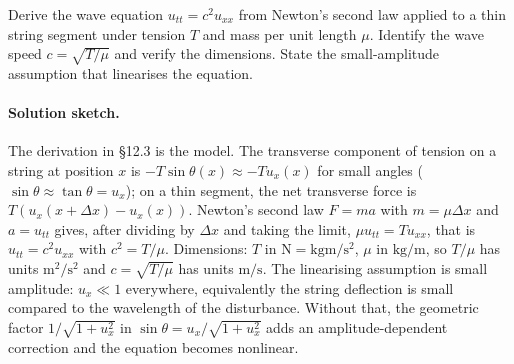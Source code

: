 \begin{exercise}
Derive the wave equation $u_{tt} = c^{2} u_{xx}$ from Newton's
second law applied to a thin string segment under tension $T$ and
mass per unit length $\mu$. Identify the wave speed $c =
\sqrt{T/\mu}$ and verify the dimensions. State the small-amplitude
assumption that linearises the equation.

\paragraph{Solution sketch.}
The derivation in §12.3 is the model. The transverse component of
tension on a string at position $x$ is $-T \sin\theta(x) \approx
-T u_{x}(x)$ for small angles ($\sin\theta \approx \tan\theta =
u_{x}$); on a thin segment, the net transverse force is $T(u_{x}(x
+ \Delta x) - u_{x}(x))$. Newton's second law $F = m a$ with
$m = \mu \Delta x$ and $a = u_{tt}$ gives, after dividing by
$\Delta x$ and taking the limit, $\mu u_{tt} = T u_{xx}$, that
is $u_{tt} = c^{2} u_{xx}$ with $c^{2} = T/\mu$. Dimensions:
$T$ in $\si{\newton} = \si{\kilogram\meter\per\second\squared}$,
$\mu$ in $\si{\kilogram\per\meter}$, so $T/\mu$ has units
$\si{\meter\squared\per\second\squared}$ and $c = \sqrt{T/\mu}$
has units $\si{\meter\per\second}$. The linearising assumption is
small amplitude: $u_{x} \ll 1$ everywhere, equivalently the
string deflection is small compared to the wavelength of the
disturbance. Without that, the geometric factor $1/\sqrt{1 +
u_{x}^{2}}$ in $\sin\theta = u_{x}/\sqrt{1 + u_{x}^{2}}$ adds an
amplitude-dependent correction and the equation becomes
nonlinear.
\end{exercise}

